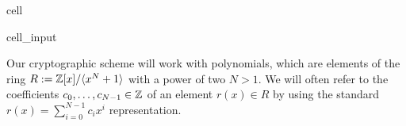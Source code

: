 \documentclass[letterpaper,10pt,english]{jupyterBook}
\begin{document}
\begin{sphinxuseclass}{cell}\begin{sphinxVerbatimInput}

\begin{sphinxuseclass}{cell_input}
\begin{sphinxVerbatim}[commandchars=\\\{\}]
  
   
   
   
     
   
          
   
   
\end{sphinxVerbatim}

\end{sphinxuseclass}\end{sphinxVerbatimInput}

\end{sphinxuseclass}\label{\detokenize{Thesis:ring-learning-with-errors}}
\begin{DUlineblock}{0em}
\item[] 
\end{DUlineblock}
\label{\detokenize{Thesis:the-ring-r}}
\begin{DUlineblock}{0em}
\item[] 
\end{DUlineblock}

\sphinxAtStartPar
Our cryptographic scheme will work with polynomials, which are elements of the ring \(R := \mathbb Z[x]/\langle x^N +1 \rangle\) with a power of two \(N > 1\).
We will often refer to the coefficients \(c_0,\dots,c_{N-1} \in \mathbb Z\) of an element \(r(x) \in R\) by using the standard \(r(x) = \sum_{i=0}^{N-1} c_i x^i\) representation.
\end{document}
